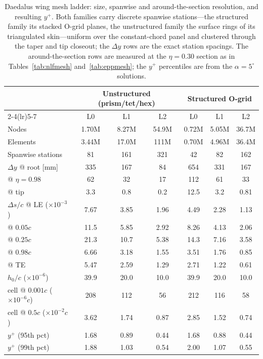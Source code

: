 \documentclass[journal]{new-aiaa}
\begin{document}
\begin{table}[tp]
  \centering
  \small
  \caption{Daedalus wing mesh ladder: size, spanwise and
  around-the-section resolution, and resulting $y^+$. Both families
  carry discrete spanwise stations---the structured family its stacked
  O-grid planes, the unstructured family the surface rings of its
  triangulated skin---uniform over the constant-chord panel and
  clustered through the taper and tip closeout; the $\Delta y$ rows are
  the exact station spacings. The around-the-section rows are measured
  at the $\eta\!=\!0.30$ section as in Tables~\ref{tab:nlfmesh}
  and~\ref{tab:eppmesh}; the $y^+$ percentiles are from the
  $\alpha\!=\!5^\circ$ solutions.}
  \label{tab:daemesh}
  \begin{tabular}{l ccc ccc}
    \toprule
    & \multicolumn{3}{c}{Unstructured (prism/tet/hex)} & \multicolumn{3}{c}{Structured O-grid}\\
    \cmidrule(lr){2-4}\cmidrule(lr){5-7}
    & L0 & L1 & L2 & L0 & L1 & L2 \\
    \midrule
    Nodes    & 1.70M & 8.27M & 54.9M & 0.72M & 5.05M & 36.7M \\
    Elements & 3.44M & 17.0M & 111M  & 0.70M & 4.96M & 36.4M \\
    \addlinespace
    Spanwise stations         & 81   & 161  & 321  & 42   & 82   & 162 \\
    $\Delta y$ @ root [mm]    & 335  & 167  & 84   & 654  & 331  & 167 \\
    \quad @ $\eta\!=\!0.98$   & 62   & 32   & 17   & 112  & 61   & 33  \\
    \quad @ tip               & 3.3  & 0.8  & 0.2  & 12.5 & 3.2  & 0.81 \\
    \addlinespace
    $\Delta s/c$ @ LE ($\times10^{-3}$) & 7.67 & 3.85 & 1.96 & 4.49 & 2.28 & 1.13 \\
    \quad @ $0.05c$                     & 11.5 & 5.85 & 2.92 & 8.26 & 4.13 & 2.06 \\
    \quad @ $0.25c$                     & 21.3 & 10.7 & 5.38 & 14.3 & 7.16 & 3.58 \\
    \quad @ $0.98c$                     & 6.66 & 3.18 & 1.55 & 3.51 & 1.76 & 0.85 \\
    \quad @ TE                          & 5.47 & 2.59 & 1.29 & 2.71 & 1.22 & 0.61 \\
    \addlinespace
    $h_0/c$ ($\times10^{-6}$)           & 39.9 & 20.0 & 10.0 & 39.9 & 20.0 & 10.0 \\
    cell @ $0.001c$ ($\times10^{-6}c$)  & 208  & 112  & 56   & 212  & 116  & 58 \\
    cell @ $0.5c$ ($\times10^{-2}c$)    & 3.62 & 1.74 & 0.87 & 2.85 & 1.52 & 0.74 \\
    \addlinespace
    $y^+$ (95th pct)          & 1.68 & 0.89 & 0.44 & 1.68 & 0.88 & 0.44 \\
    $y^+$ (99th pct)          & 1.88 & 1.03 & 0.54 & 2.00 & 1.07 & 0.55 \\
    \bottomrule
  \end{tabular}
\end{table}
\end{document}
